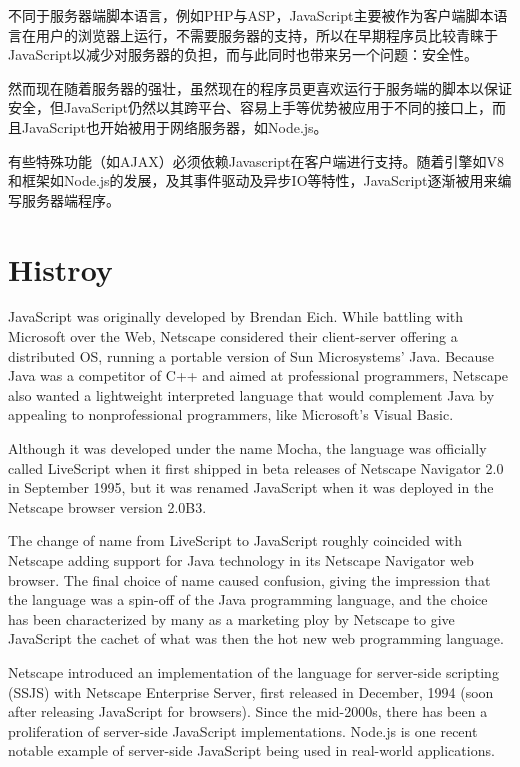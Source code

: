 不同于服务器端脚本语言，例如PHP与ASP，JavaScript主要被作为客户端脚本语言在用户的浏览器上运行，不需要服务器的支持，所以在早期程序员比较青睐于JavaScript以减少对服务器的负担，而与此同时也带来另一个问题：安全性。


然而现在随着服务器的强壮，虽然现在的程序员更喜欢运行于服务端的脚本以保证安全，但JavaScript仍然以其跨平台、容易上手等优势被应用于不同的接口上，而且JavaScript也开始被用于网络服务器，如Node.js。

有些特殊功能（如AJAX）必须依赖Javascript在客户端进行支持。随着引擎如V8和框架如Node.js的发展，及其事件驱动及异步IO等特性，JavaScript逐渐被用来编写服务器端程序。



\chapter{Histroy}

JavaScript was originally developed by Brendan Eich. While battling with Microsoft over the Web, Netscape considered their client-server offering a distributed OS, running a portable version of Sun Microsystems' Java. Because Java was a competitor of C++ and aimed at professional programmers, Netscape also wanted a lightweight interpreted language that would complement Java by appealing to nonprofessional programmers, like Microsoft's Visual Basic.

Although it was developed under the name Mocha, the language was officially called LiveScript when it first shipped in beta releases of Netscape Navigator 2.0 in September 1995, but it was renamed JavaScript when it was deployed in the Netscape browser version 2.0B3.


The change of name from LiveScript to JavaScript roughly coincided with Netscape adding support for Java technology in its Netscape Navigator web browser. The final choice of name caused confusion, giving the impression that the language was a spin-off of the Java programming language, and the choice has been characterized by many as a marketing ploy by Netscape to give JavaScript the cachet of what was then the hot new web programming language.

Netscape introduced an implementation of the language for server-side scripting (SSJS) with Netscape Enterprise Server, first released in December, 1994 (soon after releasing JavaScript for browsers). Since the mid-2000s, there has been a proliferation of server-side JavaScript implementations. Node.js is one recent notable example of server-side JavaScript being used in real-world applications.



